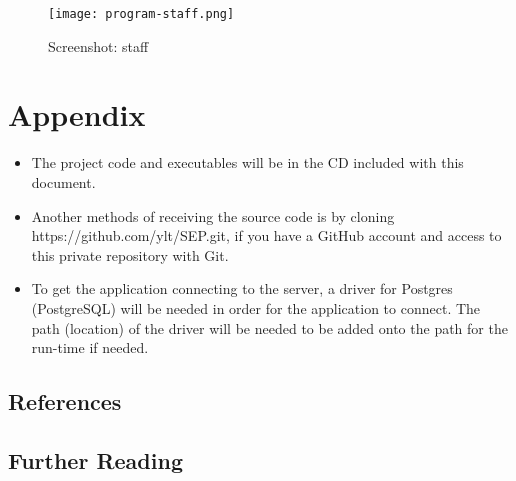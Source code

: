 \documentclass{unitemplate}
\begin{document}
\begin{figure}[H]
    \centering
    \texttt{[image: program-staff.png]}
    \caption{Screenshot: staff}
\end{figure}

\clearpage

\section{Appendix}
\begin{itemize}
    \item The project code and executables will be in the CD included with this document.
\item Another methods of receiving the source code is by cloning https://github.com/ylt/SEP.git, if you have a GitHub account and access to this private repository with Git.
    \item To get the application connecting to the server, a driver for Postgres (PostgreSQL) will be needed in order for the application to connect. The path (location) of the driver will be needed to be added onto the path for the run-time if needed.
\end{itemize}


\nocite{*}
\subsection{References}
	\printbibliography[heading=none,category=cited]
\subsection{Further Reading}
    \printbibliography[omitnumbers=true,heading=none,notcategory=cited]
\clearpage
	
\end{document}
